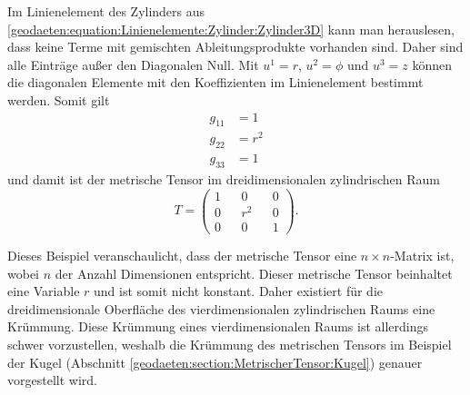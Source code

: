 Im Linienelement des Zylinders aus \eqref{geodaeten:equation:Linienelemente:Zylinder:Zylinder3D} kann man herauslesen, dass keine Terme mit gemischten Ableitungsprodukte vorhanden sind.
Daher sind alle Einträge außer den Diagonalen Null.
Mit $u^1 = r$, $u^2 = \phi$ und $u^3 = z$  können die diagonalen Elemente mit den Koeffizienten im Linienelement bestimmt werden. 
Somit gilt
\begin{equation}
	\begin{aligned}
		g_{11}  &= 1  \\
		g_{22}  &= r^2 \\
		g_{33}  &= 1  
	\end{aligned}
\end{equation}
und damit ist der metrische Tensor im dreidimensionalen zylindrischen Raum
\begin{equation}
	T = \begin{pmatrix} 1 && 0 && 0 \\ 0 && r^2 && 0 \\ 0 && 0 && 1 \end{pmatrix} .
\end{equation}

Dieses Beispiel veranschaulicht, dass der metrische Tensor eine $n \times n$-Matrix ist, wobei $n$ der Anzahl Dimensionen entspricht.
Dieser metrische Tensor beinhaltet eine Variable $r$ und ist somit nicht konstant. 
Daher existiert für die dreidimensionale Oberfläche des vierdimensionalen zylindrischen Raums eine Krümmung.
Diese Krümmung eines vierdimensionalen Raums ist allerdings schwer vorzustellen, weshalb die Krümmung des metrischen Tensors im Beispiel der Kugel (Abschnitt \ref{geodaeten:section:MetrischerTensor:Kugel}) genauer vorgestellt wird.
